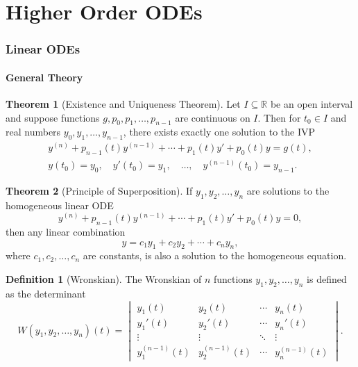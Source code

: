 \documentclass[10pt,UTF8]{article}
\newenvironment{definitionBox}
{
  \begin{tcolorbox}[colback=blue!5!white,colframe=blue!75!black,parbox=false,before
  upper=\par,before lower=\par]}
  {
\end{tcolorbox}}
\newenvironment{theoremBox}
{
  \begin{tcolorbox}[colback=yellow!5!white,colframe=yellow!75!black,parbox=false,before
  upper=\par,before lower=\par]}
  {
\end{tcolorbox}}
\theoremstyle{definition}
\newtheorem{definition inner}{Definition}[section]
\newenvironment{definition}[1][]
{
  \begin{definitionBox}
  \begin{definition inner}[#1]\hfill\par}
    {
    \end{definition inner}
\end{definitionBox}}
\theoremstyle{definition}
\newtheorem{theorem inner}{Theorem}[section]
\newenvironment{theorem}[1][]
{
  \begin{theoremBox}
  \begin{theorem inner}[#1]\hfill\par}
    {
    \end{theorem inner}
\end{theoremBox}}
\theoremstyle{definition}
\newtheorem*{proof inner}{\textit{Proof}}
\theoremstyle{plain}
\newtheorem{tip inner}{Tip}[section]
\theoremstyle{remark}
\begin{document}
\part*{Higher Order ODEs}

\section{Linear ODEs}

\subsection{General Theory}

\begin{theorem}[Existence and Uniqueness Theorem]
  {}\label{thm: Existence and Uniqueness Thm for Higher Order Linear Eq}
  Let \(I \subseteq \mathbb{R}\) be an open interval and suppose
  functions \(g, p_0, p_1, \ldots, p_{n-1}\) are continuous on \(I\).
  Then for \(t_0 \in I\) and real numbers \(y_0, y_1, \ldots, y_{n-1}\),
  there exists exactly one solution to the IVP
  \begin{gather*}
    y^{(n)} + p_{n-1}(t) y^{(n-1)} + \cdots + p_1(t) y' + p_0(t) y = g(t), \\
    y(t_0) = y_0, \quad
    y'(t_0) = y_1, \quad
    \ldots, \quad
    y^{(n-1)}(t_0) = y_{n-1}.
  \end{gather*}
\end{theorem}

\begin{theorem}[Principle of Superposition]
  {}\label{thm: Principle of Superposition}
  If \(y_1, y_2, \ldots, y_n\) are solutions to the homogeneous linear ODE
  \begin{equation*}
    y^{(n)} + p_{n-1}(t) y^{(n-1)} + \cdots + p_1(t) y' + p_0(t) y = 0,
  \end{equation*}
  then any linear combination
  \begin{equation*}
    y = c_1 y_1 + c_2 y_2 + \cdots + c_n y_n,
  \end{equation*}
  where \(c_1, c_2, \ldots, c_n\) are constants, is also a solution
  to the homogeneous equation.
\end{theorem}

\begin{definition}[Wronskian]
  {}\label{def: Wronskian}
  The Wronskian of \(n\) functions \(y_1, y_2, \ldots, y_n\) is
  defined as the determinant
  \begin{equation*}
    W(y_1, y_2, \ldots, y_n)(t) =
    \begin{vmatrix}
      y_1(t) & y_2(t) & \cdots & y_n(t) \\
      y_1'(t) & y_2'(t) & \cdots & y_n'(t) \\
      \vdots & \vdots & \ddots & \vdots \\
      y_1^{(n-1)}(t) & y_2^{(n-1)}(t) & \cdots & y_n^{(n-1)}(t)
    \end{vmatrix}.
  \end{equation*}
\end{definition}
\end{document}
